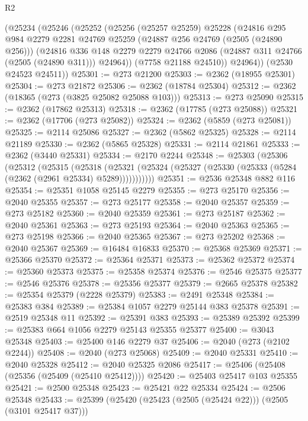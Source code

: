 \begin{lexlean}{R2}
\begin{coremodule}
    (@25234
      (@25246
        (@25252
          (@25256
            (@25257 @25259)
            @25228
            (@24816
              @295
              @984
              @2279
              @2281
              @24769
              @25259
              (@24887 @256 @24769 (@2505 (@24890 @256)))
              (@24816
                @336
                @148
                @2279
                @2279
                @24766
                @2086
                (@24887 @311 @24766 (@2505 (@24890 @311)))
                @24964))
            (@7758 @21188 @24510))
          @24964))
      (@2530 @24523 @24511))
@25301 := @273 @21200
@25303 := @2362 (@18955 @25301)
@25304 := @273 @21872
@25306 := @2362 (@18784 @25304)
@25312 := @2362 (@18365 (@273 (@3825 @25082 @25088 @103)))
@25313 := @273 @25090
@25315 := @2362 (@17862 @25313)
@25318 := @2362 (@17785 (@273 @25088))
@25321 := @2362 (@17706 (@273 @25082))
@25324 := @2362 (@5859 (@273 @25081))
@25325 := @2114 @25086
@25327 := @2362 (@5862 @25325)
@25328 := @2114 @21189
@25330 := @2362 (@5865 @25328)
@25331 := @2114 @21861
@25333 := @2362 (@3440 @25331)
@25334 := @2170 @2244
@25348 := @25303
    (@25306
      (@25312
        (@25315
          (@25318
            (@25321 (@25324 (@25327 (@25330 (@25333 (@5284 (@2362 (@2961 @25334) @5289)))))))))))
@25351 := @2536 @25348 @882 @116
@25354 := @25351 @1058 @25145 @2279
@25355 := @273 @25170
@25356 := @2040 @25355
@25357 := @273 @25177
@25358 := @2040 @25357
@25359 := @273 @25182
@25360 := @2040 @25359
@25361 := @273 @25187
@25362 := @2040 @25361
@25363 := @273 @25193
@25364 := @2040 @25363
@25365 := @273 @25198
@25366 := @2040 @25365
@25367 := @273 @25202
@25368 := @2040 @25367
@25369 := @16484 @16833
@25370 := @25368 @25369
@25371 := @25366 @25370
@25372 := @25364 @25371
@25373 := @25362 @25372
@25374 := @25360 @25373
@25375 := @25358 @25374
@25376 := @2546 @25375
@25377 := @2546 @25376
@25378 := @25356 @25377
@25379 := @2665 @25378
@25382 := @25354 @25379 (@2228 @25379)
@25383 := @2491 @25348
@25384 := @25383 @384
@25389 := @25384 @1057 @2279 @25144 @383 @25378
@25391 := @2519 @25348 @11
@25392 := @25391 @383
@25393 := @25389 @25392
@25399 := @25383 @664 @1056 @2279 @25143 @25355 @25377
@25400 := @3043 @25348
@25403 := @25400 @146 @2279 @37
@25406 := @2040 (@273 (@2102 @2244))
@25408 := @2040 (@273 @25068)
@25409 := @2040 @25331
@25410 := @2040 @25328
@25412 := @2040 @25325 @2086
@25417 := @25406 (@25408 (@25356 (@25409 (@25410 @25412))))
@25420 := @25403 @25417 @103 @25355
@25421 := @2500 @25348
@25423 := @25421 @22 @25334
@25424 := @2506 @25348
@25433 := @25399 (@25420 (@25423 (@2505 (@25424 @22))) (@2505 (@3101 @25417 @37)))

\end{coremodule}
\end{lexlean}
